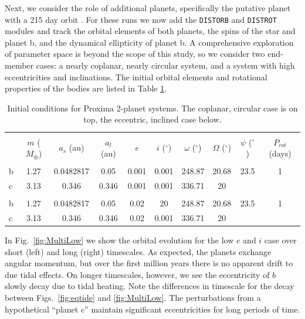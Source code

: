 \documentclass[preprint,12pt]{aastex}
\def\distorb{\texttt{\footnotesize{DISTORB}}\xspace}
\def\distrot{\texttt{\footnotesize{DISTROT}}\xspace}
\begin{document}
Next, we consider the role of additional planets, specifically the
putative planet with a 215 day orbit \citep{AngladaEscude16}. For
these runs we now add the \distorb and \distrot modules and track the
orbital elements of both planets, the spins of the star and planet b,
and the dynamical ellipticity of planet b. A comprehensive exploration
of parameter space is beyond the scope of this study, so we consider
two end-member cases: a nearly coplanar, nearly circular system, and a
system with high eccentricities and inclinations. The initial orbital
elements and rotational properties of the bodies are listed in Table \ref{tab:orbitic}.

\begin{table}[h]
\centering
\begin{tabular}{lccccccccc}
\hline\hline \\[-1.5ex]
& $m$ ($M_{\oplus}$)  & $a_s$ (au) & $a_l$ (au) & $e$ & $i$ ($^{\circ}$)
 & $\omega$ ($^{\circ}$) & $\Omega$ ($^{\circ}$) & $\psi$ ($^{\circ}$) & 
 $P_{rot}$ (days)\\[0.5ex]
\hline \\ [-1.5ex]
b & 1.27 & 0.0482817 & 0.05 & 0.001 & 0.001 & 248.87 & 20.68 & 23.5 & 1  \\
c & 3.13 & 0.346 & 0.346 & 0.001 & 0.001 & 336.71 & 20 & &  \\
\hline \\
b & 1.27 & 0.0482817 & 0.05 & 0.02 & 20 & 248.87 & 20.68 & 23.5 & 1  \\
c & 3.13 & 0.346 & 0.346 & 0.02 & 0.001 & 336.71 & 20 & &  \\
\end{tabular}
\caption{Initial conditions for Proxima 2-planet systems. The coplanar, 
  circular case is on top, the eccentric, inclined case below.}
\label{tab:orbitic}
\end{table}

In Fig.~\ref{fig:MultiLow} we show the orbital evolution for the low
$e$ and $i$ case over short (left) and long (right) timescales. As
expected, the planets exchange angular momentum, but over the first
million years there is no apparent drift to due tidal effects. On
longer timescales, however, we see the eccentricity of $b$ slowly decay
due to tidal heating. Note the differences in timescale for the decay
between Figs.~\ref{fig:eqtide} and \ref{fig:MultiLow}. The
perturbations from a hypothetical ``planet c'' maintain significant
eccentricities for long periods of time.
\end{document}
